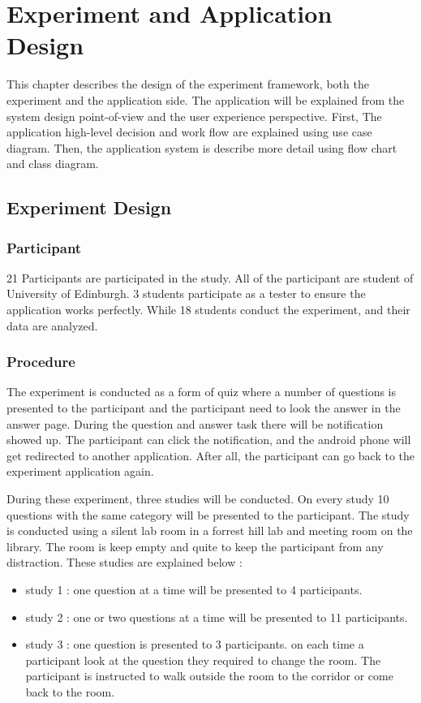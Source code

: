 \chapter{Experiment and Application Design}




This chapter describes the design of the experiment framework, both the experiment and the application side. The application will be explained from the system design point-of-view and the user experience perspective. First, The application high-level decision and work flow are explained using use case diagram. Then, the application system is describe more detail using flow chart and class diagram.



\section{Experiment Design}
\subsection{Participant}
21 Participants are participated in the study. All of the participant are student of University of Edinburgh. 3 students participate as a tester to ensure the application works perfectly. While 18 students conduct the experiment, and their data are analyzed.

\subsection{Procedure}
The experiment is conducted as a form of quiz where a number of questions is presented to the participant and the participant need to look the answer in the answer page. During the question and answer task there will be notification showed up. The participant can click the notification, and the android phone will get redirected to another application. After all, the participant can go back to the experiment application again.

During these experiment, three studies will be conducted. On every study 10 questions with the same category will be presented to the participant. The study is conducted using a silent lab room in a forrest hill lab and meeting room on the library. The room is keep empty and quite to keep the participant from any distraction.
These studies are explained below :
\begin{itemize}
\item study 1 : one question at a time will be presented to 4 participants.
\item study 2 : one or two questions at a time will be presented to 11 participants.
\item study 3 : one question is presented to 3 participants. on each time a participant look at the question they required to change the room. The participant is instructed to walk outside the room to the corridor or come back to the room.
\end{itemize}
